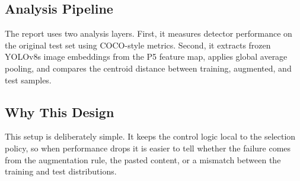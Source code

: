 \subsection{Analysis Pipeline}
The report uses two analysis layers. First, it measures detector performance on the original test set using COCO-style metrics. Second, it extracts frozen YOLOv8s image embeddings from the P5 feature map, applies global average pooling, and compares the centroid distance between training, augmented, and test samples.

\subsection{Why This Design}
This setup is deliberately simple. It keeps the control logic local to the selection policy, so when performance drops it is easier to tell whether the failure comes from the augmentation rule, the pasted content, or a mismatch between the training and test distributions.
